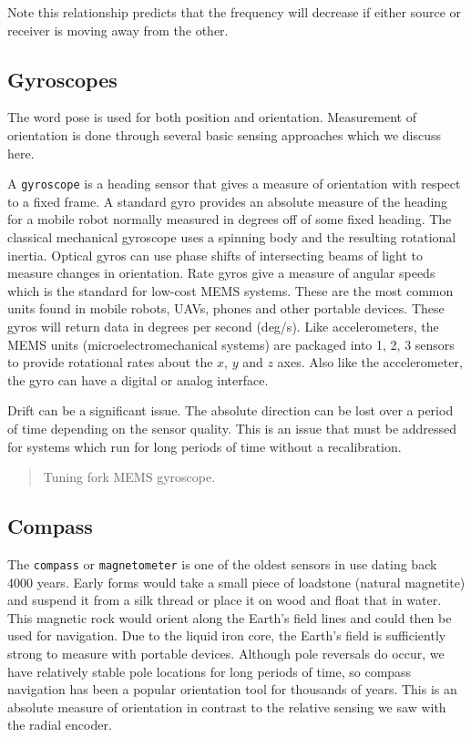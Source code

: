 Note this relationship predicts that the frequency will decrease if
either source or receiver is moving away from the other.

\hypertarget{gyroscopes}{%
\subsection{Gyroscopes}\label{gyroscopes}}

The word pose is used for both position and orientation. Measurement of
orientation is done through several basic sensing approaches which we
discuss here.

A \texttt{gyroscope} is a heading sensor that gives a measure of
orientation with respect to a fixed frame. A standard gyro provides an
absolute measure of the heading for a mobile robot normally measured in
degrees off of some fixed heading. The classical mechanical gyroscope
uses a spinning body and the resulting rotational inertia. Optical gyros
can use phase shifts of intersecting beams of light to measure changes
in orientation. Rate gyros give a measure of angular speeds which is the
standard for low-cost MEMS systems. These are the most common units
found in mobile robots, UAVs, phones and other portable devices. These
gyros will return data in degrees per second (deg/s). Like
accelerometers, the MEMS units (microelectromechanical systems) are
packaged into 1, 2, 3 sensors to provide rotational rates about the
\(x\), \(y\) and \(z\) axes. Also like the accelerometer, the gyro can
have a digital or analog interface.

Drift can be a significant issue. The absolute direction can be lost
over a period of time depending on the sensor quality. This is an issue
that must be addressed for systems which run for long periods of time
without a recalibration.

\begin{quote}
Tuning fork MEMS gyroscope.
\end{quote}

\hypertarget{compass}{%
\subsection{Compass}\label{compass}}

The \texttt{compass} or \texttt{magnetometer} is one of the oldest
sensors in use dating back 4000 years. Early forms would take a small
piece of loadstone (natural magnetite) and suspend it from a silk thread
or place it on wood and float that in water. This magnetic rock would
orient along the Earth's field lines and could then be used for
navigation. Due to the liquid iron core, the Earth's field is
sufficiently strong to measure with portable devices. Although pole
reversals do occur, we have relatively stable pole locations for long
periods of time, so compass navigation has been a popular orientation
tool for thousands of years. This is an absolute measure of orientation
in contrast to the relative sensing we saw with the radial encoder.

